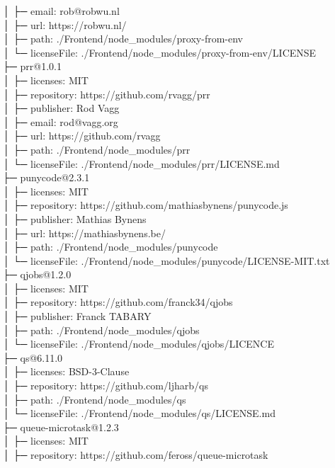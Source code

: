 │  ├─ email: rob@robwu.nl\\
│  ├─ url: https://robwu.nl/\\
│  ├─ path: ./Frontend/node\_modules/proxy-from-env\\
│  └─ licenseFile: ./Frontend/node\_modules/proxy-from-env/LICENSE\\
├─ prr@1.0.1\\
│  ├─ licenses: MIT\\
│  ├─ repository: https://github.com/rvagg/prr\\
│  ├─ publisher: Rod Vagg\\
│  ├─ email: rod@vagg.org\\
│  ├─ url: https://github.com/rvagg\\
│  ├─ path: ./Frontend/node\_modules/prr\\
│  └─ licenseFile: ./Frontend/node\_modules/prr/LICENSE.md\\
├─ punycode@2.3.1\\
│  ├─ licenses: MIT\\
│  ├─ repository: https://github.com/mathiasbynens/punycode.js\\
│  ├─ publisher: Mathias Bynens\\
│  ├─ url: https://mathiasbynens.be/\\
│  ├─ path: ./Frontend/node\_modules/punycode\\
│  └─ licenseFile: ./Frontend/node\_modules/punycode/LICENSE-MIT.txt\\
├─ qjobs@1.2.0\\
│  ├─ licenses: MIT\\
│  ├─ repository: https://github.com/franck34/qjobs\\
│  ├─ publisher: Franck TABARY\\
│  ├─ path: ./Frontend/node\_modules/qjobs\\
│  └─ licenseFile: ./Frontend/node\_modules/qjobs/LICENCE\\
├─ qs@6.11.0\\
│  ├─ licenses: BSD-3-Clause\\
│  ├─ repository: https://github.com/ljharb/qs\\
│  ├─ path: ./Frontend/node\_modules/qs\\
│  └─ licenseFile: ./Frontend/node\_modules/qs/LICENSE.md\\
├─ queue-microtask@1.2.3\\
│  ├─ licenses: MIT\\
│  ├─ repository: https://github.com/feross/queue-microtask\\
